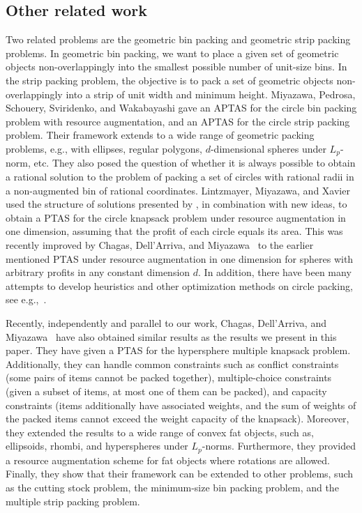 {\subsection{Other related work}
{Two related problems are the geometric bin packing and geometric strip packing problems.
In geometric bin packing, we want to place a given set of geometric objects non-overlappingly into the smallest possible number
of unit-size bins. 
In the strip packing problem, the objective is to pack a set of geometric objects non-overlappingly  into a strip of unit
width and minimum height.
Miyazawa, Pedrosa, Schouery, Sviridenko, and Wakabayashi \cite{MiyazawaPSSW16} gave an \textsf{APTAS} for the circle bin packing problem with resource augmentation, and
an \textsf{APTAS} for the circle strip packing problem. Their framework extends to a wide range of geometric packing problems, e.g., with ellipses, regular polygons, $d$-dimensional spheres under $L_p$-norm, etc.
They also posed the question of whether it is always possible to obtain a rational solution to the problem of packing a set of circles with rational radii in a non-augmented bin of rational coordinates. 
Lintzmayer, Miyazawa, and Xavier~\cite{lintzmayer2018two} used the structure of
solutions presented by \cite{MiyazawaPSSW16}, in combination with new ideas, to obtain a \textsf{PTAS} for the circle knapsack problem
under resource
augmentation in one dimension, assuming that the profit of each circle
equals its area. 
This was recently improved by Chagas, Dell\textquoteright Arriva, and Miyazawa~\cite{MiyazawaWAOA} to the earlier mentioned \textsf{PTAS} under resource augmentation in one dimension for spheres with arbitrary profits in any constant
dimension $d$. 
In addition, there have been many attempts to develop heuristics and
other optimization methods on circle packing, see e.g.,~\cite{szabo2007new,hifi2009literature,lubachevsky1997curved}.}

Recently, independently and parallel to our work, Chagas, Dell\textquoteright Arriva, and Miyazawa~\cite{ChagasNew} have also obtained similar results as the results we present in this paper. They have given a \textsf{PTAS} for the hypersphere multiple knapsack problem. Additionally, they can handle common constraints such as conflict constraints (some pairs of items cannot be packed together), multiple-choice constraints (given a subset of items, at most one of them can be packed), and capacity constraints (items additionally have associated weights, and the sum of weights of the packed items cannot exceed the weight capacity of the knapsack). Moreover, they extended the results to a wide range of convex fat objects, such as, ellipsoids, rhombi, and hyperspheres under $L_p$-norms. 
Furthermore, they provided a resource augmentation scheme for fat objects where rotations are allowed. Finally, they 
show that their framework can be extended to other problems, such as 
the cutting stock problem, the minimum-size bin packing problem, and the multiple strip packing problem.}



